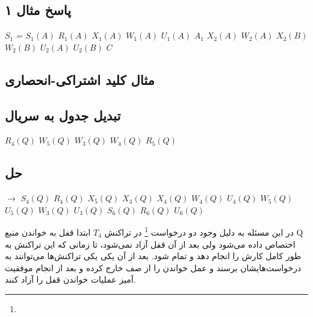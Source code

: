 \subsection*{پاسخ مثال ۱}

\begin{LTR}
    \centering
    $S_{1}$ = $S_{1}(A)$ $R_{1}(A)$ $X_{1}(A)$ $W_{1}(A)$ $U_{1}(A)$ $A_{1}$ $X_{2}(A)$ $W_{2}(A)$ $X_{2}(B)$ $W_{2}(B)$ $U_{2}(A)$ $U_{2}(B)$ $C$
\end{LTR}

\subsection*{مثال کلید اشتراکی-انحصاری}

\begin{LTR}
    \begin{table}[h]
        \centering
    \end{table}
\end{LTR}

\subsection*{تبدیل جدول به سریال}

\begin{LTR}
    $R_{4}(Q)$ $W_{5}(Q)$ $W_{3}(Q)$ $W_{4}(Q)$ $R_{5}(Q)$
\end{LTR}

\subsection*{حل}

\begin{LTR}
    \centering
    $\rightarrow$ 
    $S_{4}(Q)$ $R_{4}(Q)$ 
    $X_{5}(Q)$ $X_{3}(Q)$
    $X_{4}(Q)$ $W_{4}(Q)$ $U_{4}(Q)$
    $W_{5}(Q)$ $U_{5}(Q)$
    $W_{3}(Q)$ $U_{3}(Q)$
    $S_{6}(Q)$ $R_{6}(Q)$ $U_{6}(Q)$
\end{LTR}

در این مسئله به دلیل وجود دو درخواست \footnote{} در تراکنش $T_4$
ابتدا قفل به خواندن منبع Q اختصاص داده می‌شود ولی بعد از آن قفل آزاد نمی‌شود، تا
زمانی که این تراکنش به طور کامل کارش را انجام دهد و تمام شود. بعد از آن یکی یکی
تراکنش‌ها می‌توانند به درخواست‌هایشان برسند و عمل خواندن را از صف خارج کرده و
بعد از انجام موفقیت آمیز عملیات خواندن قفل را آزاد کنند.

